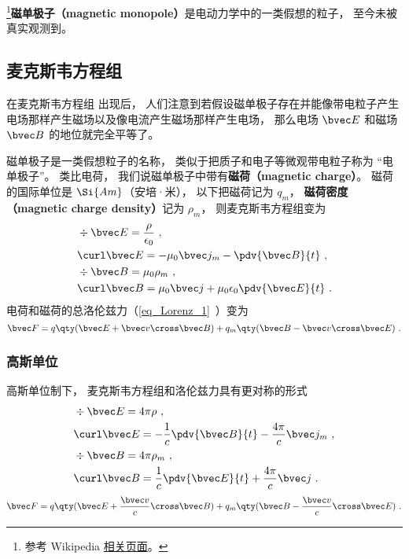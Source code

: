 

\footnote{参考 Wikipedia \href{https://en.wikipedia.org/wiki/Magnetic_monopole}{相关页面}。}\textbf{磁单极子（magnetic monopole）}是电动力学中的一类假想的粒子， 至今未被真实观测到。

\subsection{麦克斯韦方程组}

 在麦克斯韦方程组 出现后， 人们注意到若假设磁单极子存在并能像带电粒子产生电场那样产生磁场以及像电流产生磁场那样产生电场， 那么电场 $\bvec E$ 和磁场 $\bvec B$ 的地位就完全平等了。

磁单极子是一类假想粒子的名称， 类似于把质子和电子等微观带电粒子称为 “电单极子”。 类比电荷， 我们说磁单极子中带有\textbf{磁荷（magnetic charge）}。 磁荷的国际单位是 $\Si{Am}$（安培·米）， 以下把磁荷记为 $q_m$， \textbf{磁荷密度（magnetic charge density）}记为 $\rho_m$， 则麦克斯韦方程组变为
\begin{equation}
\begin{aligned}
&\div \bvec E = \frac{\rho}{\epsilon_0}~,\\
&\curl \bvec E = - \mu_0 \bvec j_m -\pdv{\bvec B}{t}~,\\
&\div \bvec B = \mu_0 \rho_m~,\\
&\curl \bvec B = \mu_0 \bvec j + \mu_0\epsilon_0 \pdv{\bvec E}{t}~.
\end{aligned}
\end{equation}
电荷和磁荷的总洛伦兹力（\autoref{eq_Lorenz_1}~）变为
\begin{equation}
\bvec F = q \qty(\bvec E + \bvec v \cross \bvec B) +
q_m \qty(\bvec B - \bvec v \cross \bvec E)~.
\end{equation}


\subsubsection{高斯单位}
高斯单位制下， 麦克斯韦方程组和洛伦兹力具有更对称的形式
\begin{equation}\label{eq_BMono_1}
\begin{aligned}
&\div \bvec E = 4\pi\rho~,\\
&\curl \bvec E = -\frac{1}{c}\pdv{\bvec B}{t}  - \frac{4\pi}{c}\bvec j_m~,\\
&\div \bvec B = 4\pi\rho_m~,\\
&\curl \bvec B = \frac{1}{c}\pdv{\bvec E}{t} + \frac{4\pi}{c} \bvec j~.
\end{aligned}
\end{equation}
\begin{equation}
\bvec F = q \qty(\bvec E + \frac{\bvec v}{c}\cross \bvec B) + q_m \qty(\bvec B - \frac{\bvec v}{c}\cross \bvec E)~.
\end{equation}

